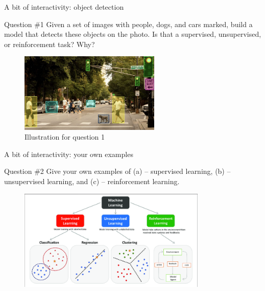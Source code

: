 \documentclass{beamer}
\begin{document}
    \begin{frame}{A bit of interactivity: object detection}
        \begin{exampleblock}{Question \#1}
            Given a set of images with people, dogs, and cars marked, build a model that detects these objects on the photo. Is that a supervised, unsupervised, or reinforcement task? Why?
        \end{exampleblock}

        \begin{figure}
        \centering
            \includegraphics[width=0.6\textwidth]{images/presentation/bounding_boxes.jpg}
            \caption{Illustration for question 1}
        \end{figure}
    \end{frame}

    \begin{frame}{A bit of interactivity: your own examples}
        \begin{exampleblock}{Question \#2}
            Give your own examples of (a) -- supervised learning, (b) -- unsupervised learning, and (c) -- reinforcement learning.
        \end{exampleblock}

        \begin{figure}
        \centering
            \includegraphics[width=0.8\textwidth]{images/presentation/types_of_ml.png}
        \end{figure}
    \end{frame}
\end{document}
